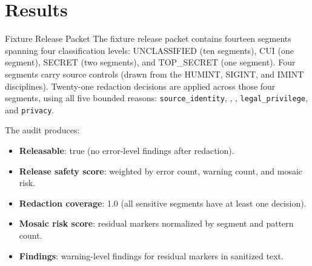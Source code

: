 \documentclass[
  ignorenonframetext,
]{beamer}
\author{\texorpdfstring{}{}}
\date{}
\providecommand{\tightlist}{%
  \setlength{\itemsep}{0pt}\setlength{\parskip}{0pt}}
\begin{document}
\section{Results}\label{results}

\begin{frame}{Fixture Release Packet}
\protect{}\label{fixture-release-packet}
The fixture release packet contains fourteen segments spanning four
classification levels: UNCLASSIFIED (ten segments), CUI (one segment),
SECRET (two segments), and TOP\_SECRET (one segment). Four segments
carry source controls (drawn from the HUMINT, SIGINT, and IMINT
disciplines). Twenty-one redaction decisions are applied across those
four segments, using all five bounded reasons:
\texttt{source\_identity}, ,
, \texttt{legal\_privilege}, and
\texttt{privacy}.

The audit produces:

\begin{itemize}
\tightlist
\item
  \textbf{Releasable}: true (no error-level findings after redaction).
\item
  \textbf{Release safety score}: weighted by error count, warning count,
  and mosaic risk.
\item
  \textbf{Redaction coverage}: 1.0 (all sensitive segments have at least
  one decision).
\item
  \textbf{Mosaic risk score}: residual markers normalized by segment and
  pattern count.
\item
  \textbf{Findings}: warning-level findings for residual markers in
  sanitized text.
\end{itemize}
\end{frame}
\end{document}
